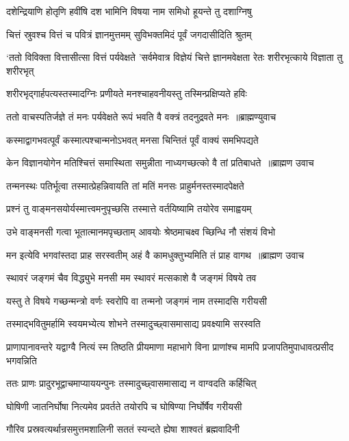 \twolineshloka
{दशेन्द्रियाणि होतृणि हवींषि दश भामिनि}
{विषया नाम समिधो हूयन्ते तु दशाग्निषु}


\twolineshloka
{चित्तं स्रुवश्च वित्तं च पवित्रं ज्ञानमुत्तमम्}
{सुविभक्तमिदं पूर्वं जगदासीदिति श्रुतम्}


\threelineshloka
{`ततो विविक्ता वित्तासीत्सा वित्तं पर्यवेक्षते}
{'सर्वमेवात्र विज्ञेयं चित्ते ज्ञानमवेक्षता}
{रेतः शरीरभृत्काये विज्ञाता तु शरीरभृत्}


\twolineshloka
{शरीरभृद्गार्हपत्यस्तस्मादग्निः प्रणीयते}
{मनश्चाहवनीयस्तु तस्मिन्प्रक्षिप्यते हविः}


\threelineshloka
{ततो वाचस्पतिर्जज्ञे तं मनः पर्यवेक्षते}
{रूपं भवति वै वक्त्रं तदनुद्रवते मनः ॥ब्राह्मण्युवाच}
{}


\twolineshloka
{कस्माद्वागभवत्पूर्वं कस्मात्पश्चान्मनोऽभवत्}
{मनसा चिन्तितं पूर्वं वाक्यं समभिपद्यते}


\threelineshloka
{केन विज्ञानयोगेन मतिश्चित्तं समास्थिता}
{समुन्नीता नाध्यगच्छत्को वै तां प्रतिबाधते ॥ब्राह्मण उवाच}
{}


\twolineshloka
{तन्मनस्थः पतिर्भूत्वा तस्मात्प्रेहन्निवायति}
{तां मतिं मनसः प्राहुर्मनस्तस्मादपेक्षते}


\twolineshloka
{प्रश्नं तु वाङ्मनसयोर्यस्मात्त्वमनुपृच्छसि}
{तस्मात्ते वर्तयिष्यामि तयोरेव समाह्वयम्}


\twolineshloka
{उभे वाङ्मनसी गत्वा भूतात्मानमपृच्छताम्}
{आवयोः श्रेष्ठमाचक्ष्व च्छिन्धि नौ संशयं विभो}


\threelineshloka
{मन इत्येवि भगवांस्तदा प्राह सरस्वतीम्}
{अहं वै कामधुक्तुभ्यमिति तं प्राह वागथ ॥ब्राह्मण उवाच}
{}


\twolineshloka
{स्थावरं जङ्गमं चैव विद्ध्युभे मनसी मम}
{स्थावरं मत्सकाशे वै जङ्गमं विषये तव}


\twolineshloka
{यस्तु ते विषये गच्छन्मन्त्रो वर्णः स्वरोपि वा}
{तन्मनो जङ्गमं नाम तस्मादसि गरीयसी}


\twolineshloka
{तस्माद्भवितुमर्हामि स्वयमभ्येत्य शोभने}
{तस्मादुच्छ्वासमासाद्य प्रवक्ष्यामि सरस्वति}


\threelineshloka
{प्राणापानावन्तरे यद्वाग्वै नित्यं स्म तिष्ठति}
{प्रीयमाणा महाभागे विना प्राणांश्च मामपि}
{प्रजापतिमुपाधावत्प्रसीद भगवन्निति}


\twolineshloka
{ततः प्राणः प्रादुरभूद्वाचमाप्याययन्पुनः}
{तस्मादुच्छ्वासमासाद्य न वाग्वदति कर्हिचित्}


\twolineshloka
{घोषिणी जातनिर्घोषा नित्यमेव प्रवर्तते}
{तयोरपि च घोषिण्या निर्घोर्षैव गरीयसी}


\twolineshloka
{गौरिव प्रस्रवत्यर्थान्रसमुत्तमशालिनी}
{सततं स्यन्दते ह्येषा शाश्वतं ब्रह्मवादिनी}


